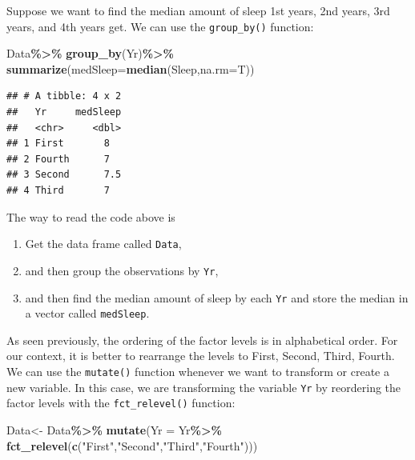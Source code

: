 \documentclass[
]{book}
\newenvironment{Shaded}{\begin{snugshade}}{\end{snugshade}}
\newcommand{\AttributeTok}[1]{\textcolor[rgb]{0.13,0.29,0.53}{#1}}
\newcommand{\FunctionTok}[1]{\textcolor[rgb]{0.13,0.29,0.53}{\textbf{#1}}}
\newcommand{\NormalTok}[1]{#1}
\newcommand{\OtherTok}[1]{\textcolor[rgb]{0.56,0.35,0.01}{#1}}
\newcommand{\SpecialCharTok}[1]{\textcolor[rgb]{0.81,0.36,0.00}{\textbf{#1}}}
\newcommand{\StringTok}[1]{\textcolor[rgb]{0.31,0.60,0.02}{#1}}
\providecommand{\tightlist}{%
  \setlength{\itemsep}{0pt}\setlength{\parskip}{0pt}}
\begin{document}
Suppose we want to find the median amount of sleep 1st years, 2nd years, 3rd years, and 4th years get. We can use the \texttt{group\_by()} function:

\begin{Shaded}
\begin{Highlighting}[]
\NormalTok{Data}\SpecialCharTok{\%\textgreater{}\%}
  \FunctionTok{group\_by}\NormalTok{(Yr)}\SpecialCharTok{\%\textgreater{}\%}
  \FunctionTok{summarize}\NormalTok{(}\AttributeTok{medSleep=}\FunctionTok{median}\NormalTok{(Sleep,}\AttributeTok{na.rm=}\NormalTok{T))}
\end{Highlighting}
\end{Shaded}

\begin{verbatim}
## # A tibble: 4 x 2
##   Yr     medSleep
##   <chr>     <dbl>
## 1 First       8  
## 2 Fourth      7  
## 3 Second      7.5
## 4 Third       7
\end{verbatim}

The way to read the code above is

\begin{enumerate}
\def\labelenumi{\arabic{enumi}.}
\tightlist
\item
  Get the data frame called \texttt{Data},
\item
  and then group the observations by \texttt{Yr},
\item
  and then find the median amount of sleep by each \texttt{Yr} and store the median in a vector called \texttt{medSleep}.
\end{enumerate}

As seen previously, the ordering of the factor levels is in alphabetical order. For our context, it is better to rearrange the levels to First, Second, Third, Fourth. We can use the \texttt{mutate()} function whenever we want to transform or create a new variable. In this case, we are transforming the variable \texttt{Yr} by reordering the factor levels with the \texttt{fct\_relevel()} function:

\begin{Shaded}
\begin{Highlighting}[]
\NormalTok{Data}\OtherTok{\textless{}{-}}\NormalTok{ Data}\SpecialCharTok{\%\textgreater{}\%}
  \FunctionTok{mutate}\NormalTok{(}\AttributeTok{Yr =}\NormalTok{ Yr}\SpecialCharTok{\%\textgreater{}\%}
           \FunctionTok{fct\_relevel}\NormalTok{(}\FunctionTok{c}\NormalTok{(}\StringTok{"First"}\NormalTok{,}\StringTok{"Second"}\NormalTok{,}\StringTok{"Third"}\NormalTok{,}\StringTok{"Fourth"}\NormalTok{)))}
\end{Highlighting}
\end{Shaded}
\end{document}
